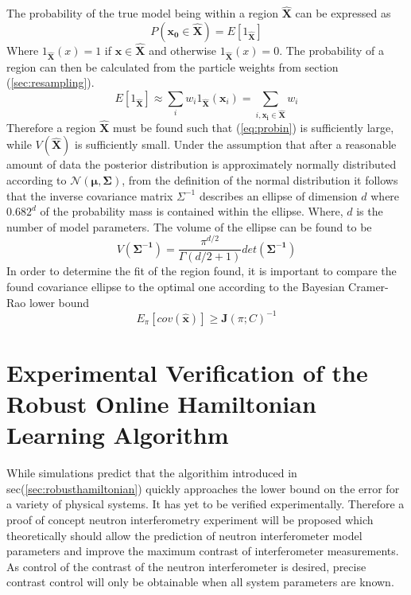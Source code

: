 The probability of the true model being within a region $\mathbf{\hat{X}}$ can be expressed as 
\begin{equation}
P(\mathbf{x_0}\in \mathbf{\hat{X}}) = E[1_{\mathbf{\hat{X}}}]
\end{equation}
Where $1_{\mathbf{\hat{X}}}(x) = 1$ if $\mathbf{x}\in \mathbf{\hat{X}}$ and otherwise $1_{\mathbf{\hat{X}}}(x) = 0$. 
The probability of a region can then be calculated from the particle weights from section (\ref{sec:resampling}). 
\begin{equation}
E[1_{\mathbf{\hat{X}}}] \approx \sum \limits_i w_i 1_{\mathbf{\hat{X}}}(\mathbf{x}_i) = \sum \limits_{i,\mathbf{x_i}\in\mathbf{\hat{X}}} w_i
\label{eq:probin}
\end{equation}
Therefore a region $\mathbf{\hat{X}}$ must be found such that (\ref{eq:probin}) is sufficiently large, while $V(\mathbf{\hat{X}})$ is sufficiently small. Under the assumption that after a reasonable amount of data the posterior distribution is approximately normally distributed according to $\mathcal{N}(\mathbf{\mu},\mathbf{\Sigma})$, from the definition of the normal distribution it follows that the inverse covariance matrix $\Sigma^{-1}$ describes an ellipse of dimension $d$ where $0.682^d$ of the probability mass is contained within the ellipse. Where, $d$ is the number of model parameters. 
The volume of the ellipse can be found to be 
\begin{equation}
V(\mathbf{\Sigma^{-1}}) = \frac{\pi^{d/2}}{\Gamma(d/2+1)}det(\mathbf{\Sigma^{-1}}) 
\end{equation}
In order to determine the fit of the region found, it is important to compare the found covariance ellipse to the optimal one according to the Bayesian Cramer-Rao lower bound 
\begin{equation*}
E_\pi [cov(\mathbf{\hat{x}})] \geq \mathbf{J}(\pi;C)^{-1}
\end{equation*}
\section{Experimental Verification of the Robust Online Hamiltonian Learning Algorithm}
While simulations predict that the algorithim introduced in sec(\ref{sec:robusthamiltonian}) quickly approaches the lower bound on the error for a variety of physical systems.\cite{hamiltonian_learning} It has yet to be verified experimentally. Therefore a proof of concept neutron interferometry experiment will be proposed which theoretically should allow the prediction of neutron interferometer model parameters and improve the maximum contrast of interferometer measurements. As control of the contrast of the neutron interferometer is desired, precise contrast control will only be obtainable when all system parameters are known. 
